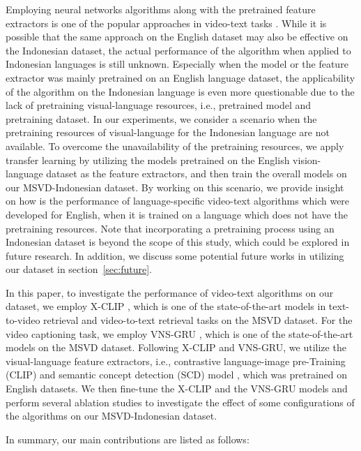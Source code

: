 \documentclass{article}
\begin{document}
Employing neural networks algorithms along with the pretrained feature extractors is one of the popular approaches in video-text tasks \cite{DBLP:conf/ecai/Chen0020a, 10.1145/3474085.3479207, 10.1007/978-3-030-77004-4_1, 10.1145/3503161.3547910}. While it is possible that the same approach on the English dataset may also be effective on the Indonesian dataset, the actual performance of the algorithm when applied to Indonesian languages is still unknown. Especially when the model or the feature extractor was mainly pretrained on an English language dataset, the applicability of the algorithm on the Indonesian language is even more questionable due to the lack of pretraining visual-language resources, i.e., pretrained model and pretraining dataset. In our experiments, we consider a scenario when the pretraining resources of visual-language for the Indonesian language are not available. To overcome the unavailability of the pretraining resources, we apply transfer learning by utilizing the models pretrained on the English vision-language dataset as the feature extractors, and then train the overall models on our MSVD-Indonesian dataset. By working on this scenario, we provide insight on how is the performance of language-specific video-text algorithms which were developed for English, when it is trained on a language which does not have the pretraining resources. Note that incorporating a pretraining process using an Indonesian dataset is beyond the scope of this study, which could be explored in future research. In addition, we discuss some potential future works in utilizing our dataset in section~\ref{sec:future}.

In this paper, to investigate the performance of video-text algorithms on our dataset, we employ X-CLIP \cite{10.1145/3503161.3547910}, which is one of the state-of-the-art models in text-to-video retrieval and video-to-text retrieval tasks on the MSVD dataset. For the video captioning task, we employ VNS-GRU \cite{DBLP:conf/ecai/Chen0020a}, which is one of the state-of-the-art models on the MSVD dataset. Following X-CLIP and VNS-GRU, we utilize the visual-language feature extractors, i.e., contrastive language-image pre-Training (CLIP) \cite{Radford2021LearningTV} and semantic concept detection (SCD) model \cite{SCN_CVPR2017}, which was pretrained on English datasets. We then fine-tune the X-CLIP and the VNS-GRU models and perform several ablation studies to investigate the effect of some configurations of the algorithms on our MSVD-Indonesian dataset.

In summary, our main contributions are listed as follows:
\end{document}
